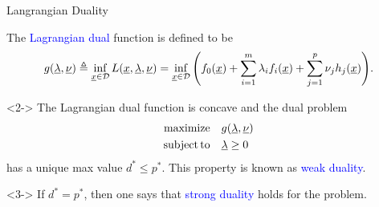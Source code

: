 \documentclass[10pt,letterpaper,english]{beamer}
\begin{document}
\begin{frame}{Langrangian Duality}

\begin{definition}
The \textcolor{blue}{Lagrangian dual} function is defined to be \vspace{-1.5mm}
\[ g(\underline{\lambda},\underline{\nu}) \triangleq \inf_{\underline{x}\in \mathcal{D}} L(\underline{x},\underline{\lambda},\underline{\nu}) = \inf_{\underline{x}\in \mathcal{D}} \Bigg( f_0(\underline{x}) + \sum_{i=1}^m \lambda_i f_i(\underline{x}) + \sum_{j=1}^p \nu_j h_j(\underline{x}) \Bigg). \]
\end{definition}



\begin{lemma}<2->
The Lagrangian dual function is concave and the dual problem \vspace{-2.5mm}
\begin{align*}
\mathrm{maximize} \quad & g(\vecnot{\lambda},\vecnot{\nu}) \\
\mathrm{subject\,to} \quad & \vecnot{\lambda} \geq 0 \vspace{-1mm}
\end{align*}
has a unique max value $d^* \leq p^*$.
This property is known as \textcolor{blue}{weak duality}.
\end{lemma}

\begin{definition}<3->
If $d^* = p^*$, then one says that \textcolor{blue}{strong duality} holds for the problem.
\end{definition}


\end{frame}
\end{document}

